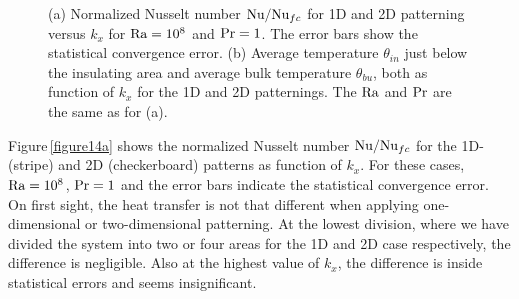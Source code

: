 \begin{figure}
\centering
{}
\caption{%
(a) Normalized Nusselt number $\text{Nu}/\text{Nu}_{fc}$ for 1D and 2D patterning
versus $k_x$ for $\text{Ra}=10^8$ and
$\text{Pr}=1$.  The error bars show the statistical convergence error.  (b)
Average temperature $\theta_{in}$ just below the insulating area and
average bulk temperature $\theta_{bu}$, both as function of $k_x$ for the
1D and 2D patternings.  The $\text{Ra}$ and $\text{Pr}$ are the same as for (a).  }
\label{figure14}%
\end{figure}%

Figure\,\ref{figure14a} shows the normalized Nusselt number $\text{Nu}/\text{Nu}_{fc}$
for the 1D- (stripe) and 2D (checkerboard) patterns as function of $k_x$.  For
these cases, $\text{Ra}=10^8$, $\text{Pr}=1$ and the error bars indicate the
statistical convergence error.  On first sight, the heat transfer is not that
different when applying one-dimensional or two-dimensional patterning.  At the
lowest division, where we have divided the system into two or four areas for
the 1D and 2D case respectively, the difference is negligible.  Also at the
highest value of $k_x$, the difference is inside statistical errors and seems
insignificant. 

